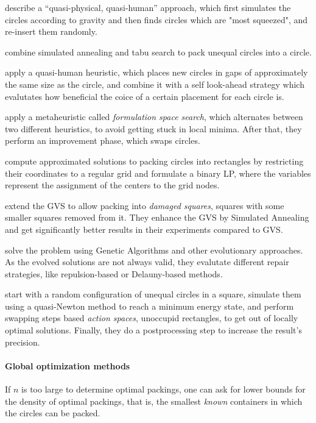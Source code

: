 \textcite{WHZX2002improved} describe a “quasi-physical, quasi-human” approach, which first simulates the circles according to gravity and then finds circles which are "most squeezed", and re-insert them randomly.

\textcite{ZD2005effective} combine simulated annealing and tabu search to pack unequal circles into a circle.

\textcite{HLLX2006new} apply a quasi-human heuristic, which places new circles in gaps of approximately the same size as the circle, and combine it with a self look-ahead strategy which evalutates how beneficial the coice of a certain placement for each circle is.

\textcite{LB2013packing} apply a metaheuristic called \emph{formulation space search}, which alternates between two different heuristics, to avoid getting stuck in local minima. After that, they perform an improvement phase, which swaps circles.

\textcite{LIE2014approximate} compute approximated solutions to packing circles into rectangles by restricting their coordinates to a regular grid and formulate a binary LP, where the variables represent the assignment of the centers to the grid nodes.

\textcite{ZYC2015packing} extend the GVS to allow packing into \emph{damaged squares}, squares with some smaller squares removed from it. They enhance the GVS by Simulated Annealing and get significantly better results in their experiments compared to GVS.

\textcite{FMC2015evolutionary} solve the problem using Genetic Algorithms and other evolutionary approaches. As the evolved solutions are not always valid, they evalutate different repair strategies, like repulsion-based or Delauny-based methods.

\textcite{HHY2015action} start with a random configuration of unequal circles in a square, simulate them using a quasi-Newton method to reach a minimum energy state, and perform swapping steps based \emph{action spaces}, unoccupid rectangles, to get out of locally optimal solutions. Finally, they do a postprocessing step to increase the result's precision.

\paragraph{Global optimization methods}

If $n$ is too large to determine optimal packings, one can ask for lower bounds for the density of optimal packings, that is, the smallest \emph{known} containers in which the circles can be packed.

